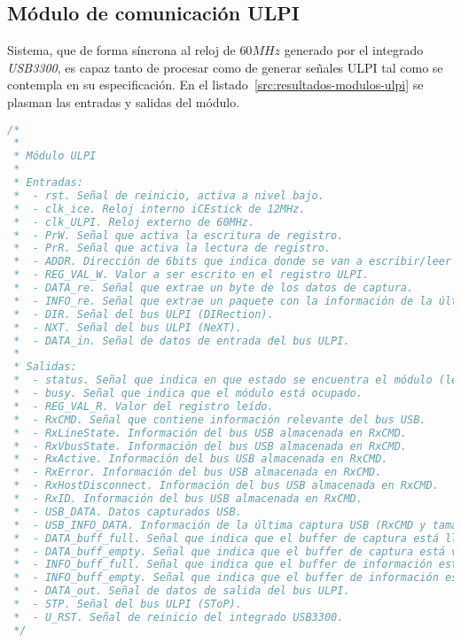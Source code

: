 \subsection{Módulo de comunicación ULPI}
Sistema, que de forma síncrona al reloj de $60MHz$ generado por el integrado \emph{USB3300}, es capaz tanto de procesar como de generar señales ULPI tal como se contempla en su especificación\cite{ulpi-specs}. En el listado~\ref{src:resultados-modulos-ulpi} se plasman las entradas y salidas del módulo.

\begin{lstlisting}[language=Verilog,
    caption={Entradas y salidas del módulo ULPI.},
    label=src:resultados-modulos-ulpi]
/*
 *
 * Módulo ULPI
 *
 * Entradas:
 *  - rst. Señal de reinicio, activa a nivel bajo.
 *  - clk_ice. Reloj interno iCEstick de 12MHz.
 *  - clk_ULPI. Reloj externo de 60MHz.
 *  - PrW. Señal que activa la escritura de registro.
 *  - PrR. Señal que activa la lectura de registro.
 *  - ADDR. Dirección de 6bits que indica donde se van a escribir/leer los datos.
 *  - REG_VAL_W. Valor a ser escrito en el registro ULPI.
 *  - DATA_re. Señal que extrae un byte de los datos de captura.
 *  - INFO_re. Señal que extrae un paquete con la información de la última captura.
 *  - DIR. Señal del bus ULPI (DIRection).
 *  - NXT. Señal del bus ULPI (NeXT).
 *  - DATA_in. Señal de datos de entrada del bus ULPI.
 *
 * Salidas:
 *  - status. Señal que indica en que estado se encuentra el módulo (lectura, escritura, etc..)
 *  - busy. Señal que indica que el módulo está ocupado.
 *  - REG_VAL_R. Valor del registro leído.
 *  - RxCMD. Señal que contiene información relevante del bus USB.
 *  - RxLineState. Información del bus USB almacenada en RxCMD.
 *  - RxVbusState. Información del bus USB almacenada en RxCMD.
 *  - RxActive. Información del bus USB almacenada en RxCMD.
 *  - RxError. Información del bus USB almacenada en RxCMD.
 *  - RxHostDisconnect. Información del bus USB almacenada en RxCMD.
 *  - RxID. Información del bus USB almacenada en RxCMD.
 *  - USB_DATA. Datos capturados USB.
 *  - USB_INFO_DATA. Información de la última captura USB (RxCMD y tamaño).
 *  - DATA_buff_full. Señal que indica que el buffer de captura está lleno.
 *  - DATA_buff_empty. Señal que indica que el buffer de captura está vacío.
 *  - INFO_buff_full. Señal que indica que el buffer de información está lleno.
 *  - INFO_buff_empty. Señal que indica que el buffer de información está vacío.
 *  - DATA_out. Señal de datos de salida del bus ULPI.
 *  - STP. Señal del bus ULPI (SToP).
 *  - U_RST. Señal de reinicio del integrado USB3300.
 */
\end{lstlisting}

